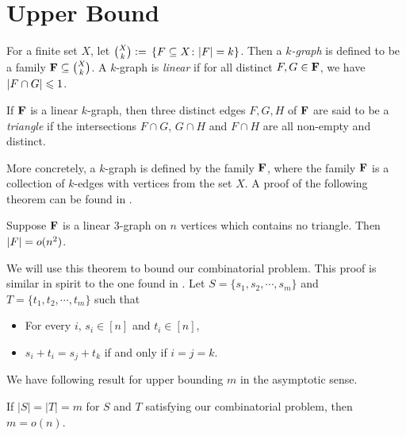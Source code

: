 \section{Upper Bound}

\begin{definition}
	For a finite set $X$, let $\binom{X}{k} {\;\vcentcolon=\;}\left\lbrace F\subseteq X\colon |F| = k \right\rbrace$. Then a {\em $k$-graph} is defined to be a family ${\mathbf F}\subseteq \binom{X}{k}$.
	A $k$-graph is {\em linear} if for all distinct $F,G \in {\mathbf F}$, we have $|F\cap G| \leqslant 1$.
\end{definition}
\begin{definition}
	If ${\mathbf F}$ is a linear $k$-graph, then three distinct edges $F,G,H$ of ${\mathbf F}$ are said to be a {\em triangle} if the intersections $F\cap G$, $G\cap H$ and $F\cap H$ are all non-empty and distinct.
\end{definition}

More concretely, a $k$-graph is defined by the family ${\mathbf F}$, where the family ${\mathbf F}$ is a collection of $k$-edges with vertices from the set $X$. A proof of the following theorem can be found in \cite{EFR86}.
\begin{theorem} 
	\label{thm:RS}
	Suppose $ {\mathbf F} $ is a linear 3-graph on $ n $ vertices which contains no triangle. Then $ \left\vert{F}\right\vert = o(n^2) $. 
\end{theorem}

\noindent We will use this theorem to bound our combinatorial problem. This proof is similar in spirit to the one found in \cite{FGV87}. Let $ S = \{s_1, s_2, \cdots, s_m\} $ and $ T =\{ t_1,t_2, \cdots, t_m\} $ such that 
\begin{itemize}
	\item For every $ i $, $ s_i \in [n] $ and $ t_i \in [n] $,
	\item $ s_i + t_i = s_j + t_k $  if and only if $ i = j = k $.
\end{itemize}
We have following result for upper bounding $ m $ in the asymptotic sense. 
\begin{theorem}
	If $|S| = |T| = m$ for $S$ and $T$ satisfying our combinatorial problem, then $ m = o(n) $.
\end{theorem}  

